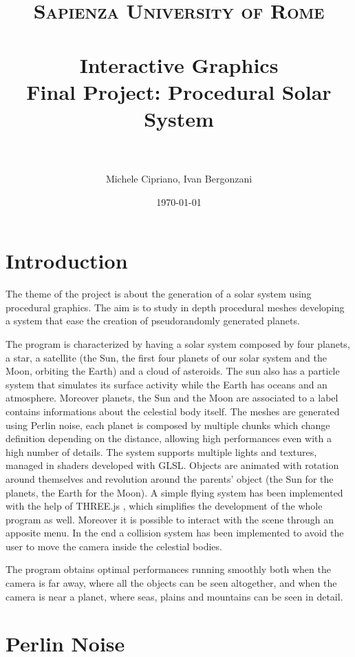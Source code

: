 \documentclass[paper=a4, fontsize=11pt]{scrartcl} %
\title{	
\normalfont \normalsize 
\textsc{Sapienza University of Rome} \\ [25pt] %
\horrule{0.5pt} \\[0.4cm] %
\huge Interactive Graphics \\ %
\large Final Project: Procedural Solar System \\
\horrule{2pt} \\[0.5cm] %
}
\author{Michele Cipriano, Ivan Bergonzani} %
\date{\normalsize\today} %
\numberwithin{equation}{section} %
\numberwithin{figure}{section} %
\numberwithin{table}{section} %
\theoremstyle{definition}
\begin{document}
\maketitle %


\section{Introduction}

The theme of the project is about the generation of a solar system using
procedural graphics. The aim is to study in depth procedural meshes developing
a system that ease the creation of pseudorandomly generated planets.

The program is characterized by having a solar system composed by four planets,
a star, a satellite (the Sun, the first four planets of our solar system and the
Moon, orbiting the Earth) and a cloud of asteroids. The sun also has a particle system that simulates its surface activity while the Earth has oceans and an atmosphere. Moreover planets, the Sun and the Moon are associated to a label contains informations about the celestial body itself. The meshes are generated using Perlin noise, each
planet is composed by multiple chunks which change definition depending on
the distance, allowing high performances even with a high number of details.
The system supports multiple lights and textures, managed in shaders developed
with GLSL. Objects are animated with rotation around themselves and
revolution around the parents' object (the Sun for the planets, the Earth for
the Moon). A simple flying system has been implemented with the help of
THREE.js \cite{threejs}, which simplifies the development of the whole program as well.
Moreover it is possible to interact with the scene through an apposite menu.
In the end a collision system has been implemented to avoid the user to move the camera inside the celestial bodies.

The program obtains optimal performances running smoothly both when the
camera is far away, where all the objects can be seen altogether, and when the camera
is near a planet, where seas, plains and mountains can be seen in detail.


\section{Perlin Noise}
\end{document}
